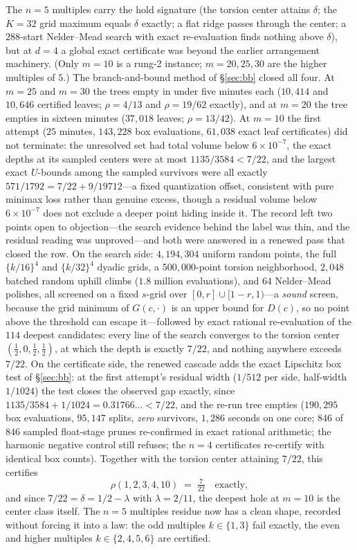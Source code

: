 The $n=5$ multiples carry the hold signature (the torsion center
attains $\delta$; the $K=32$ grid maximum equals $\delta$ exactly; a
flat ridge passes through the center; a $288$-start Nelder--Mead search
with exact re-evaluation finds nothing above $\delta$), but at $d=4$ a
global exact certificate was beyond the earlier arrangement
machinery. (Only $m=10$ is a rung-2 instance; $m=20,25,30$ are the
higher multiples of $5$.) The branch-and-bound method of \S\ref{sec:bb}
closed all four. At $m=25$ and $m=30$ the trees empty in under five
minutes each ($10{,}414$ and $10{,}646$ certified leaves; $\rho=4/13$
and $\rho=19/62$ exactly), and at $m=20$ the tree empties in sixteen
minutes ($37{,}018$ leaves; $\rho=13/42$). At $m=10$ the first attempt
($25$ minutes, $143{,}228$ box evaluations, $61{,}038$ exact leaf
certificates) did not terminate: the unresolved set had total volume
below $6\times10^{-7}$, the exact depths at its sampled centers were at
most $1135/3584<7/22$, and the largest exact $U$-bounds among the
sampled survivors were all exactly $571/1792=7/22+9/19712$---a fixed
quantization offset, consistent with pure minimax loss rather than
genuine excess, though a residual volume below $6\times10^{-7}$ does not
exclude a deeper point hiding inside it. The record left two points
open to objection---the search evidence behind the label was thin, and
the residual reading was unproved---and both were answered in a renewed
pass that closed the row. On the search side: $4{,}194{,}304$ uniform
random points, the full $\{k/16\}^4$ and $\{k/32\}^4$ dyadic grids, a
$500{,}000$-point torsion neighborhood, $2{,}048$ batched random uphill
climbs ($1.8$ million evaluations), and $64$ Nelder--Mead polishes, all
screened on a fixed $s$-grid over $[0,r]\cup[1-r,1)$---a \emph{sound}
screen, because the grid minimum of $G(c,\cdot)$ is an upper bound for
$D(c)$, so no point above the threshold can escape it---followed by
exact rational re-evaluation of the $114$ deepest candidates: every
line of the search converges to the torsion center
$(\tfrac12,0,\tfrac12,\tfrac12)$, at which the depth is exactly $7/22$,
and nothing anywhere exceeds $7/22$. On the certificate side, the
renewed cascade adds the exact Lipschitz box test of \S\ref{sec:bb}:
at the first attempt's residual width ($1/512$ per side, half-width
$1/1024$) the test closes the observed gap exactly, since
$1135/3584+1/1024=0.31766\ldots<7/22$, and the re-run tree empties
($190{,}295$ box evaluations, $95{,}147$ splits, \emph{zero} survivors,
$1{,}286$ seconds on one core; $846$ of $846$ sampled float-stage
prunes re-confirmed in exact rational arithmetic; the harmonic negative
control still refuses; the $n=4$ certificates re-certify with identical
box counts). Together with the torsion center attaining $7/22$, this
certifies
\[
\rho(1,2,3,4,10)\;=\;\tfrac{7}{22}\quad\text{exactly},
\]
and since $7/22=\delta=1/2-\lambda$ with $\lambda=2/11$, the deepest
hole at $m=10$ is the center class itself. The $n=5$ multiples residue
now has a clean shape, recorded without forcing it into a law: the odd
multiples $k\in\{1,3\}$ fail exactly, the even and higher multiples
$k\in\{2,4,5,6\}$ are certified.

